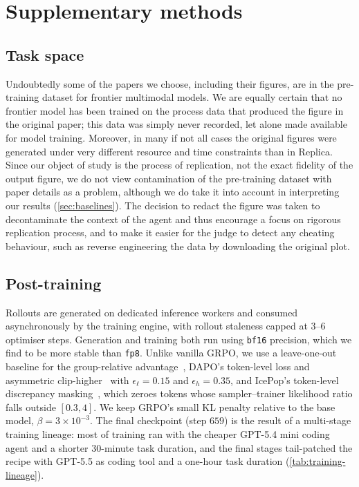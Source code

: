 \documentclass[garamond,a4paper]{inherent}
\begin{document}
\FloatBarrier
\newpage
\section{Supplementary methods}

\subsection{Task space}
\label{sec:contamination}

Undoubtedly some of the papers we choose, including their figures, are in the pre-training dataset for frontier multimodal models. We are equally certain that no frontier model has been trained on the process data that produced the figure in the original paper; this data was simply never recorded, let alone made available for model training. Moreover, in many if not all cases the original figures were generated under very different resource and time constraints than in Replica. Since our object of study is the process of replication, not the exact fidelity of the output figure, we do not view contamination of the pre-training dataset with paper details as a problem, although we do take it into account in interpreting our results (\autoref{sec:baselines}). The decision to redact the figure was taken to decontaminate the context of the agent and thus encourage a focus on rigorous replication process, and to make it easier for the judge to detect any cheating behaviour, such as reverse engineering the data by downloading the original plot. 

\subsection{Post-training} 
\label{app:post-training}

Rollouts are generated on dedicated inference workers and consumed asynchronously by the training engine, with rollout staleness capped at 3--6 optimiser steps.
Generation and training both run using \texttt{bf16} precision, which we find to be more stable than \texttt{fp8}. Unlike vanilla GRPO, we use a leave-one-out baseline for the group-relative advantage~\citep{ahmadian2024backtobasics}, DAPO's token-level loss and asymmetric clip-higher~\citep{yu2025dapo} with $\epsilon_\ell=0.15$ and $\epsilon_h=0.35$, and IcePop's token-level discrepancy masking~\citep{lingteam2025ring1t}, which zeroes tokens whose sampler--trainer likelihood ratio falls outside $[0.3, 4]$. We keep GRPO's small KL penalty relative to the base model, $\beta=3{\times}10^{-3}$.
The final checkpoint (step $659$) is the result of a multi-stage training lineage: most of training ran with the cheaper GPT-5.4 mini coding agent and a shorter $30$-minute task duration, and the final stages tail-patched the recipe with GPT-5.5 as coding tool and a one-hour task duration (\autoref{tab:training-lineage}). 
\end{document}
